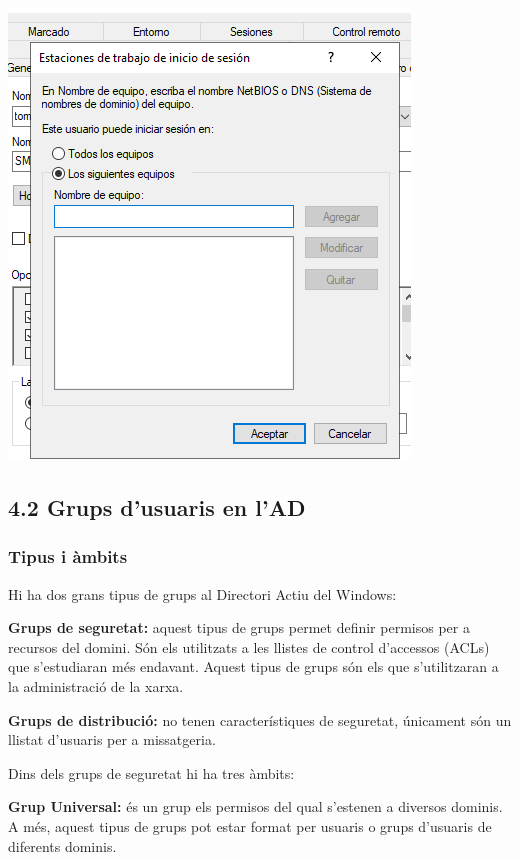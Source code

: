 \documentclass[
  a4paper,
]{article}
\begin{document}
\includegraphics{png/usuaris9.png}

\subsection{4.2 Grups d'usuaris en l'AD}\label{grups-dusuaris-en-lad}

\subsubsection{Tipus i àmbits}\label{tipus-i-uxe0mbits}

Hi ha dos grans tipus de grups al Directori Actiu del Windows:

\textbf{Grups de seguretat:} aquest tipus de grups permet definir
permisos per a recursos del domini. Són els utilitzats a les llistes de
control d'accessos (ACLs) que s'estudiaran més endavant. Aquest tipus de
grups són els que s'utilitzaran a la administració de la xarxa.

\textbf{Grups de distribució:} no tenen característiques de seguretat,
únicament són un llistat d'usuaris per a missatgeria.

Dins dels grups de seguretat hi ha tres àmbits:

\textbf{Grup Universal:} és un grup els permisos del qual s'estenen a
diversos dominis. A més, aquest tipus de grups pot estar format per
usuaris o grups d'usuaris de diferents dominis.
\end{document}
